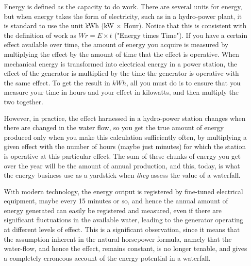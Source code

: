 Energy is defined as the capacity to do work. There are several units for energy, but when energy takes the form of electricity, such as in a hydro-power plant, it is standard to use the unit kWh (kW $\times$ Hour). Notice that this is consistent with the definition of work as $Wr = E \times t$ ("Energy times Time"). If you have a certain effect available over time, the amount of energy you acquire is measured by multiplying the effect by the amount of time that the effect is operative. When mechanical energy is transformed into electrical energy in a power station, the effect of the generator is multiplied by the time the generator is operative with the same effect. To get the result in $kWh$, all you must do is to ensure that you measure your time in hours and your effect in kilowatts, and then multiply the two together. 

However, in practice, the effect harnessed in a hydro-power station changes when there are changed in the water flow, so you get the true amount of energy produced only when you make this calculation sufficiently often, by multiplying a given effect with the number of hours (maybe just minutes) for which the station is operative at this particular effect. The sum of these chunks of energy you get over the year will be the amount of annual production, and this, today, is what the energy business use as a yardstick when \emph{they} assess the value of a waterfall. 

With modern technology, the energy output is registered by fine-tuned electrical equipment, maybe every 15 minutes or so, and hence the annual amount of energy generated can easily be registered and measured, even if there are significant fluctuations in the available water, leading to the generator operating at different levels of effect. This is a significant observation, since it means that the assumption inherent in the natural horsepower formula, namely that the water-flow, and hence the effect, remains constant, is no longer tenable, and gives a completely erroneous account of the energy-potential in a waterfall. 

